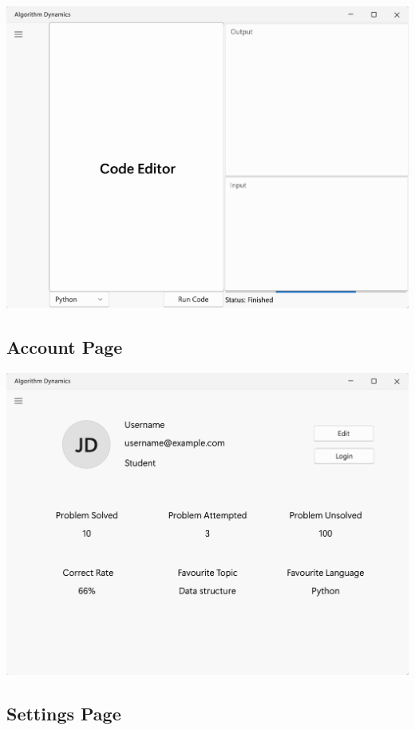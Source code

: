 \documentclass[a4paper]{report}
\begin{document}
\includegraphics[width=\textwidth, height=\textheight, keepaspectratio]{PlaygroundPage-Design}

\subsection{Account Page}

\includegraphics[width=\textwidth, height=\textheight, keepaspectratio]{AccountPage-Design}

\subsection{Settings Page}
\end{document}
